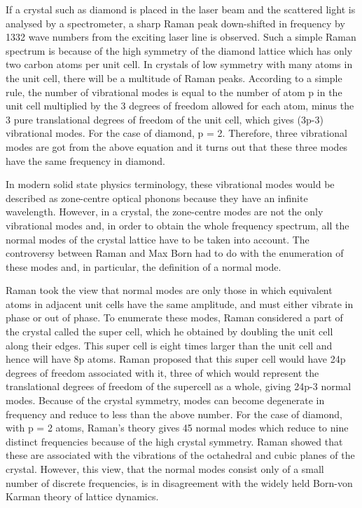 \newpage

If a crystal such as diamond is placed in the laser beam and the scattered light is analysed by a spectrometer, a sharp Raman peak down-shifted in frequency by 1332 wave numbers from the exciting laser line is observed. Such a simple Raman spectrum is because of the high symmetry of the diamond lattice which has only two carbon atoms per unit cell. In crystals of low symmetry with many atoms in the unit cell, there will be a multitude of Raman peaks. According to a simple rule, the number of vibrational modes is equal to the number of atom p in the unit cell multiplied by the 3 degrees of freedom allowed for each atom, minus the 3 pure translational degrees of freedom of the unit cell, which gives (3p-3) vibrational modes. For the case of diamond, p = 2. Therefore, three vibrational modes are got from the above equation and it turns out that these three modes have the same frequency in diamond.


In modern solid state physics terminology, these vibrational mod\-es would be described as zone-centre optical phonons because they have an infinite wavelength. However, in a crystal, the zone-centre modes are not the only vibrational modes and, in order to obtain the whole frequency spectrum, all the normal modes of the crystal lattice have to be taken into account. The controversy between Raman and Max Born had to do with the enumeration of these modes and, in particular, the definition of a normal mode.


Raman took the view that normal modes are only those in which equivalent atoms in adjacent unit cells have the same amplitude, and must either vibrate in phase or out of phase. To enumerate these modes, Raman considered a part of the crystal called the super cell, which he obtained by doubling the unit cell along their edges. This super cell is eight times larger than the unit cell and hence will have 8p atoms. Raman proposed that this super cell would have 24p degrees of freedom associated with it, three of which would represent the translational degrees of freedom of the supercell as a whole, giving 24p-3 normal modes. Because of the crystal symmetry, modes can become degenerate in frequency and reduce to less than the above number. For the case of diamond, with p = 2 atoms, \hbox{Raman's} theory gives 45 normal modes which reduce to nine distinct \hbox{frequencies} because of the high crystal symmetry. Raman showed that these are associated with the vibrations of the octahedral and cubic planes of the crystal. However, this view, that the normal modes consist only of a small number of discrete frequencies, is in disagreement with the widely held Born-von Karman theory of lattice dynamics.


